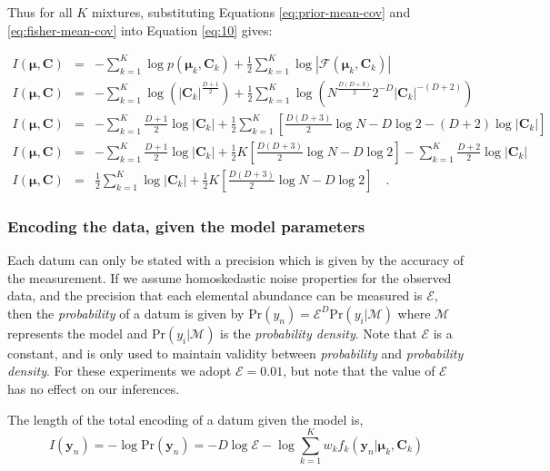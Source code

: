 \documentclass{aastex61}
\newcommand{\vect}[1]{\boldsymbol{\mathbf{#1}}}
\def\veccov{\vect{C}}
\def\vecmean{\vect{\mu}}
\def\weight{w}
\def\datum{y}
\def\data{\vect{\datum}}
\begin{document}
Thus for all $K$ mixtures, substituting Equations \ref{eq:prior-mean-cov} and 
\ref{eq:fisher-mean-cov} into Equation \ref{eq:10} gives:

\begin{eqnarray}
I(\vecmean,\veccov) &=& -\sum_{k=1}^{K}\log{p(\vecmean_k,\veccov_k)} + \frac{1}{2}\sum_{k=1}^{K}\log{|\mathcal{F}\left(\vecmean_k,\veccov_k\right)|} \nonumber  \\
I(\vecmean,\veccov) &=& -\sum_{k=1}^{K}\log{\left(|\veccov_k|^{\frac{D + 1}{2}}\right)}
 + \frac{1}{2}\sum_{k=1}^{K}\log{\left(N^\frac{D(D+3)}{2}2^{-D}|\veccov_k|^{-(D+2)}\right)} \nonumber \\
I(\vecmean,\veccov) &=& -\sum_{k=1}^{K}\frac{D + 1}{2}\log|\veccov_k|
 + \frac{1}{2}\sum_{k=1}^{K}\left[\frac{D(D+3)}{2}\log{N} -D\log{2} -(D+2)\log|\veccov_k|\right] \nonumber \\
I(\vecmean,\veccov) &=& -\sum_{k=1}^{K}\frac{D + 1}{2}\log|\veccov_k|
 + \frac{1}{2}K\left[\frac{D\left(D+3\right)}{2}\log{N} - D\log{2}\right]
 -\sum_{k=1}^{K}\frac{D+2}{2}\log|\veccov_k| \nonumber \\
I(\vecmean,\veccov) &=& \frac{1}{2}\sum_{k=1}^{K}\log|\veccov_k|
 + \frac{1}{2}K\left[\frac{D\left(D+3\right)}{2}\log{N} - D\log{2}\right] \quad .
\end{eqnarray}



\subsubsection{Encoding the data, given the model parameters}
\label{sec:encoding-data}


Each datum can only be stated with a precision which is given by the accuracy
of the measurement.
If we assume homoskedastic noise properties for the observed data, and the
precision that each elemental abundance can be measured is $\mathcal{E}$, then
the \emph{probability} of a datum is given by 
$\textrm{Pr}(\datum_n) = \mathcal{E}^D\textrm{Pr}(\datum_i|\mathcal{M})$
where $\mathcal{M}$ represents the model and $\textrm{Pr}(\datum_i|\mathcal{M})$
is the \emph{probability density}.
Note that $\mathcal{E}$ is a constant, and is only used to maintain validity 
between \emph{probability} and \emph{probability density}.
For these experiments we adopt $\mathcal{E} = 0.01$, but note that the value of
$\mathcal{E}$ has no effect on our inferences.

The length of the total encoding of a datum given the model is,
\begin{equation}
  I(\data_n) = -\log{\textrm{Pr}(\data_n)} = -D\log\mathcal{E} - \log\sum_{k=1}^{K}\weight_{k}f_{k}(\data_n|\vecmean_k,\veccov_k)
\end{equation}
\end{document}
